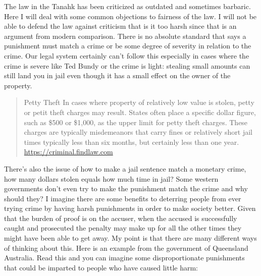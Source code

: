 \documentclass[11pt]{article}
\begin{document}
The law in the Tanahk has been criticized as outdated and sometimes barbaric. Here I will deal with some common objections to fairness of the law. I will not be able to defend the law against criticism that is it too harsh since that is an argument from modern comparison. There is no absolute standard that says a punishment must match a crime or be some degree of severity in relation to the crime. Our legal system certainly can't follow this especially in cases where the crime is severe like Ted Bundy or the crime is light: stealing small amounts can still land you in jail even though it has a small effect on the owner of the property. 

\begin{quote}
Petty Theft
In cases where property of relatively low value is stolen, petty or petit theft charges may result. States often place a specific dollar figure, such as \$500 or \$1,000, as the upper limit for petty theft charges. These charges are typically misdemeanors that carry fines or relatively short jail times typically less than six months, but certainly less than one year. \url{https://criminal.findlaw.com}
\end{quote}
There's also the issue of how to make a jail sentence match a monetary crime, how many dollars stolen equals how much time in jail? Some western governments don't even try to make the punishment match the crime and why should they? I imagine there are some benefits to deterring people from ever trying crime by having harsh punishments in order to make society better. Given that the burden of proof is on the accuser, when the accused is successfully caught and prosecuted the penalty may make up for all the other times they might have been able to get away. My point is that there are many different ways of thinking about this. Here is an example from the government of Queensland Australia. Read this and you can imagine some disproportionate punishments that could be imparted to people who have caused little harm:
\end{document}
